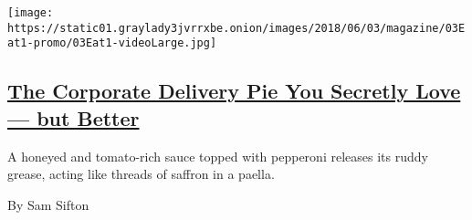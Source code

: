 \begin{enumerate}
  \texttt{[image: https://static01.graylady3jvrrxbe.onion/images/2018/06/03/magazine/03Eat1-promo/03Eat1-videoLarge.jpg]}

  \hypertarget{the-corporate-delivery-pie-you-secretly-love--but-better}{%
  \subsection{\texorpdfstring{\href{/2018/05/29/magazine/corporate-delivery-pie-pan-pizza.html}{The
  Corporate Delivery Pie You Secretly Love --- but
  Better}}{The Corporate Delivery Pie You Secretly Love --- but Better}}\label{the-corporate-delivery-pie-you-secretly-love--but-better}}

  A honeyed and tomato-rich sauce topped with pepperoni releases its
  ruddy grease, acting like threads of saffron in a paella.

  By Sam Sifton
\end{enumerate}

